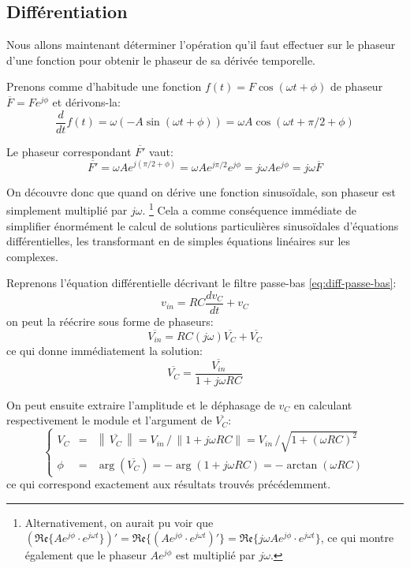 \subsection{Différentiation}

Nous allons maintenant déterminer l'opération qu'il faut effectuer
sur le phaseur d'une fonction pour obtenir le phaseur de sa dérivée temporelle.

Prenons comme d'habitude une fonction $f(t) = F\cos(\omega t + \phi)$
de phaseur $\overline{F} = Fe^{j\phi}$
et dérivons-la:
\begin{equation}
    \frac{d}{dt}f(t) = \omega (-A\sin(\omega t + \phi))
    = \omega A \cos(\omega t + \pi/2 + \phi)
\end{equation}

Le phaseur correspondant $\overline{F'}$ vaut:
\begin{equation}
    \overline{F'} = \omega A e^{j(\pi/2 + \phi)} = \omega A e^{j\pi/2} e^{j\phi}
    = j\omega A e^{j\phi} = j\omega \overline{F}
\end{equation}

On découvre donc que quand on dérive une fonction sinusoïdale,
son phaseur est simplement multiplié par $j\omega$.
\footnote{
    Alternativement, on aurait pu voir que
    $(\mathfrak{Re}\{ Ae^{j\phi} \cdot e^{j\omega t}  \})'
    = \mathfrak{Re}\{(Ae^{j\phi} \cdot e^{j\omega t})'\}
    = \mathfrak{Re}\{j\omega A e^{j\phi} \cdot e^{j\omega t}\}$,
    ce qui montre également que le phaseur $Ae^{j\phi}$
    est multiplié par $j\omega$.
}
Cela a comme conséquence immédiate de simplifier énormément
le calcul de solutions particulières sinusoïdales d'équations différentielles,
les transformant en de simples équations linéaires sur les complexes.

Reprenons l'équation différentielle décrivant le filtre passe-bas
\eqref{eq:diff-passe-bas}:
\[
    v_{in} = RC\frac{dv_C}{dt} + v_C
\]
on peut la réécrire sous forme de phaseurs:
\begin{equation}
    \overline{V_{in}} = RC(j\omega)\overline{V_C} + \overline{V_C}
\end{equation}
ce qui donne immédiatement la solution:
\begin{equation}
    \overline{V_C} = \frac{\overline{V_{in}}}{1 + j\omega RC}
\end{equation}

On peut ensuite extraire l'amplitude et le déphasage de $v_C$
en calculant respectivement le module et l'argument de $\overline{V_C}$:
\begin{equation}
    \left\{
        \begin{array}{ccl}
            V_C &=& \left\|\,\overline{V_C}\,\right\|
            = V_{in}\,/\,\|1+j\omega RC\|
            = V_{in}\,/\sqrt{1 + (\omega RC)^2} \\
            \phi &=& \arg\left(\overline{V_C}\right) = -\arg(1+j\omega RC)
            = - \arctan(\omega RC)
        \end{array}
    \right.
\end{equation}
ce qui correspond exactement aux résultats trouvés précédemment.

